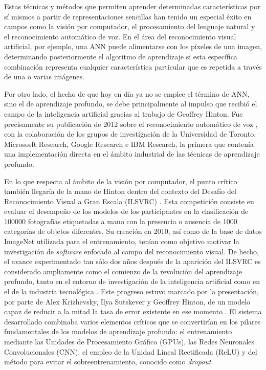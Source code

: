 Estas técnicas y métodos que permiten aprender determinadas características por sí mismos a partir de representaciones sencillas han tenido un especial éxito en campos como la visión por computador, el procesamiento del lenguaje natural y el reconocimiento automático de voz. En el área del reconocimiento visual artificial, por ejemplo, una ANN puede alimentarse con los píxeles de una imagen, determinando posteriormente el algoritmo de aprendizaje si esta específica combinación representa cualquier característica particular que es repetida a través de una o varias imágenes.

Por otro lado, el hecho de que hoy en día ya no se emplee el término de ANN, sino el de aprendizaje profundo, se debe principalmente al impulso que recibió el campo de la inteligencia artificial gracias al trabajo de Geoffrey Hinton. Fue precisamente su publicación de 2012 sobre el reconocimiento automático de voz \cite{Hinton}, con la colaboración de los grupos de investigación de la Universidad de Toronto, Micrososft Research, Google Research e IBM Research, la primera que contenía una implementación directa en el ámbito industrial de las técnicas de aprendizaje profundo.

En lo que respecta al ámbito de la visión por computador, el punto crítico también llegaría de la mano de Hinton dentro del contexto del Desafío del Reconocimiento Visual a Gran Escala (ILSVRC) \cite{ILSVRC}. Esta competición consiste en evaluar el desempeño de los modelos de los participantes en la clasificación de 100000 fotografías etiquetadas a mano con la presencia o ausencia de 1000 categorías de objetos diferentes. Su creación en 2010, así como de la base de datos ImageNet utilizada para el entrenamiento, tenían como objetivo motivar la investigación de \textit{software} enfocado al campo del reconocimiento visual. De hecho, el avance experimentado tan sólo dos años después de la aparición del ILSVRC es considerado ampliamente como el comienzo de la revolución del aprendizaje profundo, tanto en el entorno de investigación de la inteligencia artificial como en el de la industria tecnológica \cite{AIboom}. Este progreso estuvo marcado por la presentación, por parte de Alex Krizhevsky, Ilya Sutskever y Geoffrey Hinton, de un modelo capaz de reducir a la mitad la tasa de error existente en ese momento \cite{Krizhevsky}. El sistema desarrollado combinaba varios elementos críticos que se convertirían en los pilares fundamentales de los modelos de aprendizaje profundo: el entrenamiento mediante las Unidades de Procesamiento Gráfico (GPUs), las Redes Neuronales Convolucionales (CNN), el empleo de la Unidad Lineal Rectificada (ReLU) y del método para evitar el sobreentrenamiento, conocido como \textit{dropout}.

